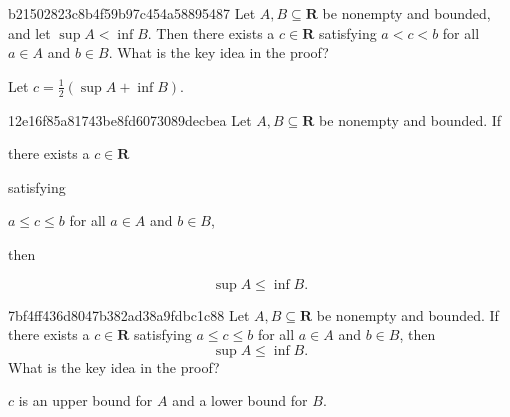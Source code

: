 \begin{note}{b21502823c8b4f59b97c454a58895487}
    Let \({ A, B \subseteq \mathbf{R} }\) be nonempty and bounded, and let \({ \sup A < \inf B }\).
    Then there exists a \({ c \in \mathbf{R} }\) satisfying \({ a < c < b }\) for all \({ a \in A }\) and \({ b \in B }\).
    What is the key idea in the proof?

    \begin{cloze}{1}
        Let \({ c = \frac{1}{2}(\sup A + \inf B) }\).
    \end{cloze}
\end{note}

\begin{note}{12e16f85a81743be8fd6073089decbea}
    Let \({ A, B \subseteq \mathbf{R} }\) be nonempty and bounded.
    If \begin{icloze}{3}there exists a \({ c \in \mathbf{R} }\)\end{icloze} satisfying \begin{icloze}{2}\({ a \leq c \leq b }\) for all \({ a \in A }\) and \({ b \in B }\),\end{icloze} then
    \begin{icloze}{1}
        \[
            \sup A \leq \inf B.
        \]
    \end{icloze}
\end{note}

\begin{note}{7bf4ff436d8047b382ad38a9fdbc1c88}
    Let \({ A, B \subseteq \mathbf{R} }\) be nonempty and bounded.
    If there exists a \({ c \in \mathbf{R} }\) satisfying \({ a \leq c \leq b }\) for all \({ a \in A }\) and \({ b \in B }\), then
    \[
        \sup A \leq \inf B.
    \]
    What is the key idea in the proof?

    \begin{cloze}{1}
        \({ c }\) is an upper bound for \({ A }\) and a lower bound for \({ B }\).
    \end{cloze}
\end{note}



